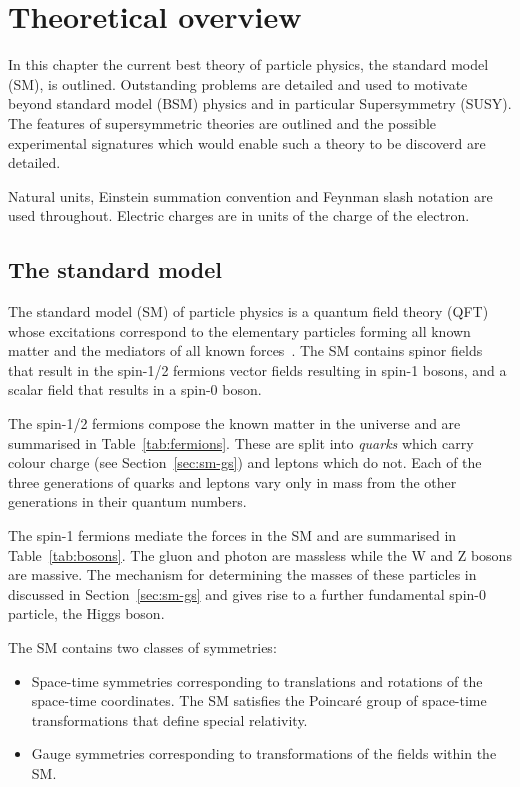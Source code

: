 \chapter{Theoretical overview}
\label{cha:theory}

In this chapter the current best theory of particle physics, the standard model (SM),
is outlined. Outstanding problems are detailed and used to motivate beyond
standard model (BSM) physics and in particular Supersymmetry (SUSY). 
The features of supersymmetric theories are outlined and the possible 
experimental signatures which would enable such a theory to be 
discoverd are detailed.

Natural units, Einstein summation convention
and Feynman slash notation are used throughout. Electric charges 
are in units of the charge of the electron.

\section{The standard model}

\label{sec:sm}
The standard model (SM) of particle physics is a quantum field theory (QFT) whose excitations
correspond to the elementary particles forming all known matter and the mediators of
all known forces~\cite{ftsm}. The SM contains spinor fields that result in the spin-1/2 fermions
vector fields resulting in spin-1 bosons, and a scalar field that results in a spin-0
boson. 

The spin-1/2 fermions compose the known matter in the universe and are summarised 
in Table~\ref{tab:fermions}. These are split into \emph{quarks} which carry colour charge 
(see Section~\ref{sec:sm-gs}) and leptons which do not. Each of the three generations of quarks and leptons vary only in
mass from the other generations in their quantum numbers.

The spin-1 fermions mediate the forces in the SM and are summarised in Table~\ref{tab:bosons}. 
The gluon and photon are massless while the W and Z bosons are massive. 
The mechanism for determining the masses of these particles in discussed in 
Section~\ref{sec:sm-gs} and gives rise to a further fundamental spin-0 particle, the Higgs boson.

The SM contains two classes of symmetries:

\begin{itemize}
\item Space-time symmetries corresponding to translations and rotations of the space-time coordinates.
The SM satisfies the Poincar\'{e} group of space-time transformations that define special relativity. 
\item Gauge symmetries corresponding to transformations of the fields within the SM.
\end{itemize}

